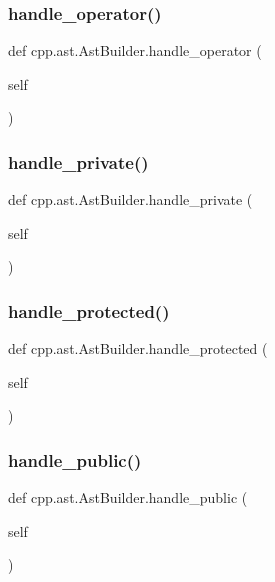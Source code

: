 \subsubsection{\texorpdfstring{handle\_operator()}{handle\_operator()}}
{\footnotesize\ttfamily def cpp.\+ast.\+Ast\+Builder.\+handle\+\_\+operator (\begin{DoxyParamCaption}\item[{}]{self }\end{DoxyParamCaption})}

\mbox{\label{classcpp_1_1ast_1_1_ast_builder_a8bc5f9563f5ead3abba5a71187162867}} 
\subsubsection{\texorpdfstring{handle\_private()}{handle\_private()}}
{\footnotesize\ttfamily def cpp.\+ast.\+Ast\+Builder.\+handle\+\_\+private (\begin{DoxyParamCaption}\item[{}]{self }\end{DoxyParamCaption})}

\mbox{\label{classcpp_1_1ast_1_1_ast_builder_aa4ff62142927f8f245a2030b444676ee}} 
\subsubsection{\texorpdfstring{handle\_protected()}{handle\_protected()}}
{\footnotesize\ttfamily def cpp.\+ast.\+Ast\+Builder.\+handle\+\_\+protected (\begin{DoxyParamCaption}\item[{}]{self }\end{DoxyParamCaption})}

\mbox{\label{classcpp_1_1ast_1_1_ast_builder_a1e69925578e0ee0a2b7aeb219eda449b}} 
\subsubsection{\texorpdfstring{handle\_public()}{handle\_public()}}
{\footnotesize\ttfamily def cpp.\+ast.\+Ast\+Builder.\+handle\+\_\+public (\begin{DoxyParamCaption}\item[{}]{self }\end{DoxyParamCaption})}

